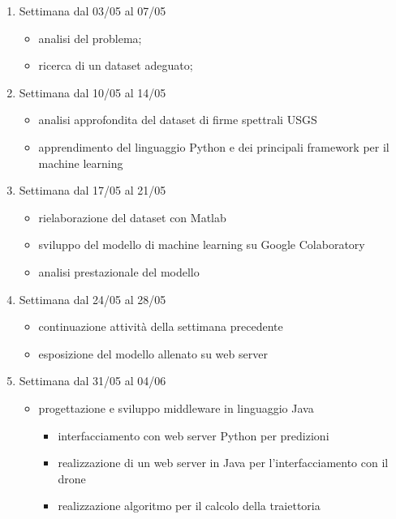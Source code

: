 \begin{enumerate}
    \item Settimana dal 03/05 al 07/05
    \begin{itemize}
        \item analisi del problema;
        \item ricerca di un dataset adeguato;
    \end{itemize}
    
    \item Settimana dal 10/05 al 14/05
    \begin{itemize}
        \item analisi approfondita del dataset di firme spettrali USGS
        \item apprendimento del linguaggio Python e dei principali framework per il machine learning
    \end{itemize}
    
    \item Settimana dal 17/05 al 21/05
    \begin{itemize}
        \item rielaborazione del dataset con Matlab
        \item sviluppo del modello di machine learning su Google Colaboratory
        \item analisi prestazionale del modello
    \end{itemize}
    
    \item Settimana dal 24/05 al 28/05
    \begin{itemize}
        \item continuazione attività della settimana precedente
        \item esposizione del modello allenato su web server
    \end{itemize}
    
    \item Settimana dal 31/05 al 04/06
    \begin{itemize}
        \item progettazione e sviluppo middleware in linguaggio Java
        \begin{itemize}
            \item interfacciamento con web server Python per predizioni
            \item realizzazione di un web server in Java per l'interfacciamento con il drone
            \item realizzazione algoritmo per il calcolo della traiettoria
        \end{itemize}
    \end{itemize}
    

\end{enumerate}
